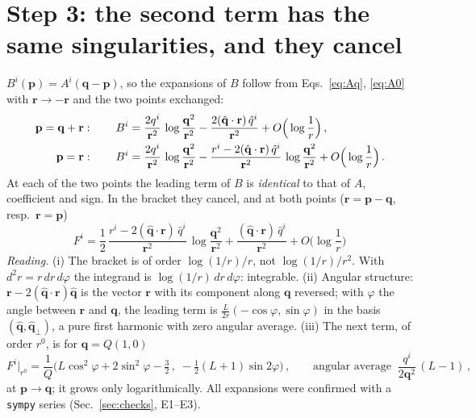 \documentclass[11pt]{article}
\newcommand{\vq}{\mathbf{q}}
\newcommand{\vp}{\mathbf{p}}
\newcommand{\vr}{\mathbf{r}}
\newcommand{\qh}{\hat{\mathbf{q}}}
\begin{document}
\section{Step 3: the second term has the same singularities, and they cancel}
$B^{i}(\vp)=A^{i}(\vq-\vp)$, so the expansions of $B$ follow from Eqs.~\eqref{eq:Aq}, \eqref{eq:A0} with $\vr\to-\vr$ and the two points exchanged:
\begin{align}
\vp=\vq+\vr:\qquad B^{i}&=\frac{2q^{i}}{\vr^{2}}\,\log\frac{\vq^{2}}{\vr^{2}}-\frac{2(\qh\cdot\vr)\,\hat q^{i}}{\vr^{2}}+O\Big(\log\frac1r\Big)\,,\notag\\
\vp=\vr:\qquad B^{i}&=\frac{2q^{i}}{\vr^{2}}\,\log\frac{\vq^{2}}{\vr^{2}}-\frac{r^{i}-2(\qh\cdot\vr)\,\hat q^{i}}{\vr^{2}}\,\log\frac{\vq^{2}}{\vr^{2}}+O\Big(\log\frac1r\Big)\,.
\end{align}
At each of the two points the leading term of $B$ is \emph{identical} to that of $A$, coefficient and sign. In the bracket they cancel, and at both points ($\vr=\vp-\vq$, resp.\ $\vr=\vp$)
\begin{equation}
\boxed{\;F^{i}=\frac12\,\frac{r^{i}-2(\qh\cdot\vr)\,\hat q^{i}}{\vr^{2}}\,\log\frac{\vq^{2}}{\vr^{2}}+\frac{(\qh\cdot\vr)\,\hat q^{i}}{\vr^{2}}+O\Big(\log\frac1r\Big)\;}\label{eq:F}
\end{equation}
\emph{Reading.} (i) The bracket is of order $\log(1/r)/r$, not $\log(1/r)/r^{2}$. With $d^{2}r=r\,dr\,d\varphi$ the integrand is $\log(1/r)\,dr\,d\varphi$: integrable. (ii) Angular structure: $\vr-2(\qh\cdot\vr)\qh$ is the vector $\vr$ with its component along $\vq$ reversed; with $\varphi$ the angle between $\vr$ and $\vq$, the leading term is $\frac{L}{2r}(-\cos\varphi,\sin\varphi)$ in the basis $(\qh,\qh_{\perp})$, a pure first harmonic with zero angular average. (iii) The next term, of order $r^{0}$, is for $\vq=Q(1,0)$
\begin{equation}
F^{i}\big|_{r^{0}}=\frac{1}{Q}\Big(L\cos^{2}\varphi+2\sin^{2}\varphi-\tfrac32\,,\;-\tfrac12(L+1)\sin2\varphi\Big)\,,\qquad\text{angular average }\ \frac{q^{i}}{2\vq^{2}}\,(L-1)\,,
\end{equation}
at $\vp\to\vq$; it grows only logarithmically. All expansions were confirmed with a \texttt{sympy} series (Sec.~\ref{sec:checks}, E1--E3).
\end{document}
